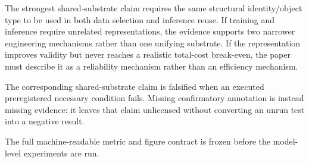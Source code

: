 The strongest shared-substrate claim requires the same structural identity/object type to be used in both data selection and inference reuse. If training and inference require unrelated representations, the evidence supports two narrower engineering mechanisms rather than one unifying substrate. If the representation improves validity but never reaches a realistic total-cost break-even, the paper must describe it as a reliability mechanism rather than an efficiency mechanism.

The corresponding shared-substrate claim is falsified when an executed preregistered necessary condition fails. Missing confirmatory annotation is instead missing evidence: it leaves that claim unlicensed without converting an unrun test into a negative result.

The full machine-readable metric and figure contract is frozen before the model-level experiments are run.
